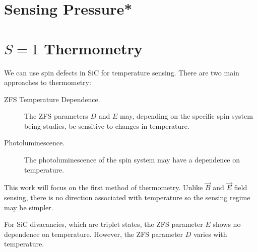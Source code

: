 \cite{Isoya2008}



\section{Sensing Pressure*}
\cite{doi:10.1021/acs.nanolett.2c03378}
\cite{PhysRevLett.112.087601}
\cite{PhysRevLett.112.187601}

\section{$S=1$ Thermometry}
\cite{Chen2011}
\cite{ajev2009}
\cite{PhysRevApplied.8.044015}
\cite{D3NR00430A}
\cite{PhysRevApplied.10.044042}
\cite{PhysRevB.104.125305}
\cite{PhysRevB.91.155404}

\cite{Quan:23}



We can use spin defects in SiC for temperature sensing. 
There are two main approaches to thermometry:
\begin{description}
    \item[ZFS Temperature Dependence.] The ZFS parameters $D$ and $E$ may, depending on the specific spin system being studies, be sensitive to changes in temperature. 
    \item[Photoluminescence.] The photoluminescence of the spin system may have a dependence on temperature. 
\end{description}

This work will focus on the first method of thermometry. Unlike $\vec{B}$ and $\vec{E}$ field sensing, there is no direction associated with temperature so the sensing regime may be simpler.  

For SiC divacancies, which are triplet states, the ZFS parameter $E$ shows no dependence on temperature. However, the ZFS parameter $D$ varies with temperature. 

